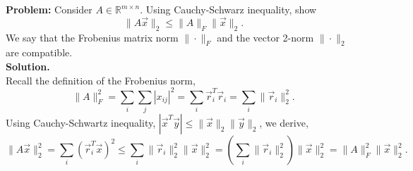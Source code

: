 \documentclass{article}
\newcommand{\R}{\ensuremath{\mathbb{R}}}
\newcommand{\x}{\times}
\newcommand{\norm}[1]{\|#1\|}
\newcommand{\normII}[1]{\norm{#1}_2}
\newcommand{\normF}[1]{\norm{#1}_F}
\newcommand{\sij}{_{ij}}
\begin{document}
\textbf{Problem:}
Consider $A\in \R^{m \x n}$. Using Cauchy-Schwarz inequality, show
\[ \normII{A\vec x} \le \normF{A} \normII{\vec x}. \]
We say that the Frobenius matrix norm $\normF{\cdot}$ and the vector 2-norm  $\normII{\cdot}$ are compatible.\\

\textbf{Solution.}\\
Recall the definition of the Frobenius norm,
\[ \normF{A}^2 = \sum_i \sum_j |x\sij|^2 = \sum_i \vec r_i^T \vec r_i = \sum_i \normII{\vec r_i}^2. \]
Using Cauchy-Schwartz inequality, $|\vec x^T \vec y| \le \normII{\vec x} \normII{\vec y}$, we derive,
\[ \normII{A\vec x}^2 = \sum_i (\vec r_i^T \vec x)^2 \le \sum_i \normII{\vec r_i}^2 \normII{\vec x}^2 = \left(\sum_i \normII{\vec r_i}^2\right) \normII{\vec x}^2 = \normF{A}^2 \normII{\vec x}^2. \]
\end{document}
